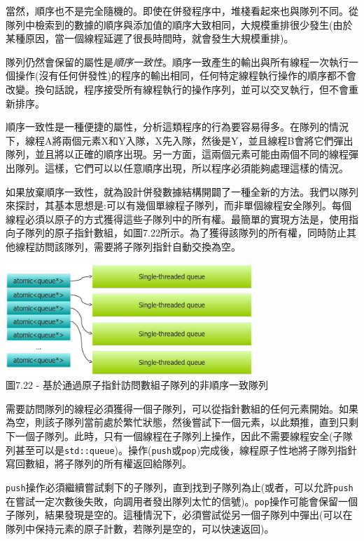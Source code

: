 當然，順序也不是完全隨機的。即使在併發程序中，堆棧看起來也與隊列不同。從隊列中檢索到的數據的順序與添加值的順序大致相同，大規模重排很少發生(由於某種原因，當一個線程延遲了很長時間時，就會發生大規模重排)。

隊列仍然會保留的屬性是\textit{順序一致性}。順序一致產生的輸出與所有線程一次執行一個操作(沒有任何併發性)的程序的輸出相同，任何特定線程執行操作的順序都不會改變。換句話說，程序接受所有線程執行的操作序列，並可以交叉執行，但不會重新排序。

順序一致性是一種便捷的屬性，分析這類程序的行為要容易得多。在隊列的情況下，線程A將兩個元素X和Y入隊，X先入隊，然後是Y，並且線程B會將它們彈出隊列，並且將以正確的順序出現。另一方面，這兩個元素可能由兩個不同的線程彈出隊列。這樣，它們可以以任意順序出現，所以程序必須能夠處理這樣的情況。

如果放棄順序一致性，就為設計併發數據結構開闢了一種全新的方法。我們以隊列來探討，其基本思想是:可以有幾個單線程子隊列，而非單個線程安全隊列。每個線程必須以原子的方式獲得這些子隊列中的所有權。最簡單的實現方法是，使用指向子隊列的原子指針數組，如圖7.22所示。為了獲得該隊列的所有權，同時防止其他線程訪問該隊列，需要將子隊列指針自動交換為空。

\begin{center}
\includegraphics[width=0.7\textwidth]{content/2/chapter7/images/22.jpg}\\
圖7.22 - 基於通過原子指針訪問數組子隊列的非順序一致隊列
\end{center}

需要訪問隊列的線程必須獲得一個子隊列，可以從指針數組的任何元素開始。如果為空，則該子隊列當前處於繁忙狀態，然後嘗試下一個元素，以此類推，直到只剩下一個子隊列。此時，只有一個線程在子隊列上操作，因此不需要線程安全(子隊列甚至可以是\texttt{std::queue})。操作(\texttt{push}或\texttt{pop})完成後，線程原子性地將子隊列指針寫回數組，將子隊列的所有權返回給隊列。

\texttt{push}操作必須繼續嘗試剩下的子隊列，直到找到子隊列為止(或者，可以允許\texttt{push}在嘗試一定次數後失敗，向調用者發出隊列太忙的信號)。\texttt{pop}操作可能會保留一個子隊列，結果發現是空的。這種情況下，必須嘗試從另一個子隊列中彈出(可以在隊列中保持元素的原子計數，若隊列是空的，可以快速返回)。


